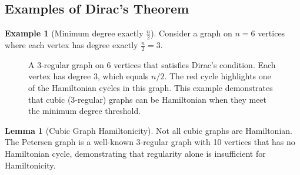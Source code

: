 \documentclass{article}
\theoremstyle{definition}
\newtheorem{example}{Example}
\newtheorem{lemma}{Lemma}
\begin{document}
\subsection{Examples of Dirac's Theorem}
\begin{example}[Minimum degree exactly $\frac{n}{2}$]
Consider a graph on $n = 6$ vertices where each vertex has degree exactly $\frac{n}{2} = 3$.
\end{example}
\begin{figure}[h!]
\begin{center}
\end{center}
\caption{A 3-regular graph on 6 vertices that satisfies Dirac's condition. Each vertex has degree 3, which equals $n/2$. The red cycle highlights one of the Hamiltonian cycles in this graph. This example demonstrates that cubic (3-regular) graphs can be Hamiltonian when they meet the minimum degree threshold.}
\label{fig:dirac-3-regular}
\end{figure}
\begin{lemma}[Cubic Graph Hamiltonicity]
Not all cubic graphs are Hamiltonian. The Petersen graph is a well-known 3-regular graph with 10 vertices that has no Hamiltonian cycle, demonstrating that regularity alone is insufficient for Hamiltonicity.
\end{lemma}
\newpage
\end{document}
